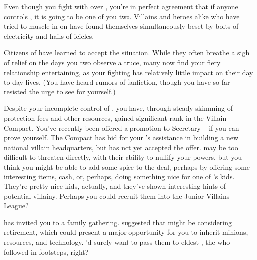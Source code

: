 \documentclass[char]{LRSguildcamp1}
\begin{document}
Even though you fight with \cOS{} over \pCityO{}, you're in perfect agreement that if anyone controls \pCityO{}, it is going to be one of you two.  Villains and heroes alike who have tried to muscle in on \pCityO{} have found themselves simultaneously beset by bolts of electricity and hails of icicles.

Citizens of \pCityO{} have learned to accept the situation. While they often breathe a sigh of relief on the days you two observe a truce, many now find your fiery relationship entertaining, as your fighting has relatively little impact on their day to day lives.  (You have heard rumors of fanfiction, though you have so far resisted the urge to see for yourself.)

Despite your incomplete control of \pCityO{}, you have, through steady skimming of protection fees and other resources, gained significant rank in the Villain Compact.  You've recently been offered a promotion to Secretary -- if you can prove yourself.  The Compact has bid for your \cArchitect{\sibling} \cArchitect{}'s assistance in building a new national villain headquarters, but \cArchitect{} has not yet accepted the offer.  \cArchitect{} may be too difficult to threaten directly, with their ability to nullify your powers, but you think you might be able to add some spice to the deal, perhaps by offering some interesting items, cash, or, perhaps, doing something nice for one of \cArchitect{}'s kids.  They're pretty nice kids, actually, and they've shown interesting hints of potential villainy.  Perhaps you could recruit them into the Junior Villains League?

\cGrandma{\Parent} has invited you to a family gathering.  \cGrandma{\They} suggested that \cGrandma{\they} might be considering retirement, which could present a major opportunity for you to inherit \cGrandma{\their} minions, resources, and technology.  \cGrandma{\They}'d surely want to pass them to \cGrandma{\their} eldest \cOldest{\offspring}, the \cOldest{\villain} who followed in \cGrandma{\their} footsteps,  right?
\end{document}
